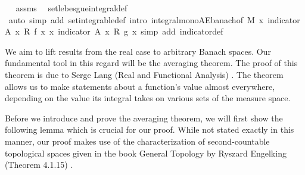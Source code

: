 \begin{isabellebody}
\isadelimproof
\ %
\endisadelimproof
%
\isatagproof
{}\isamarkupfalse%
\ assms\ \isamarkupfalse%
\ set{\isacharunderscore}{\kern0pt}lebesgue{\isacharunderscore}{\kern0pt}integral{\isacharunderscore}{\kern0pt}def\ \isamarkupfalse%
\ {\isacharparenleft}{\kern0pt}auto\ simp\ add{\isacharcolon}{\kern0pt}\ set{\isacharunderscore}{\kern0pt}integrable{\isacharunderscore}{\kern0pt}def\ intro{\isacharbang}{\kern0pt}{\isacharcolon}{\kern0pt}\ integral{\isacharunderscore}{\kern0pt}mono{\isacharunderscore}{\kern0pt}AE{\isacharunderscore}{\kern0pt}banach{\isacharbrackleft}{\kern0pt}of\ M\ {\isachardoublequoteopen}{\isasymlambda}x{\isachardot}{\kern0pt}\ indicator\ A\ x\ {\isacharasterisk}{\kern0pt}\isactrlsub R\ f\ x{\isachardoublequoteclose}\ {\isachardoublequoteopen}{\isasymlambda}x{\isachardot}{\kern0pt}\ indicator\ A\ x\ {\isacharasterisk}{\kern0pt}\isactrlsub R\ g\ x{\isachardoublequoteclose}{\isacharbrackright}{\kern0pt}{\isacharcomma}{\kern0pt}\ simp\ add{\isacharcolon}{\kern0pt}\ indicator{\isacharunderscore}{\kern0pt}def{\isacharparenright}{\kern0pt}%
\endisatagproof
{\isafoldproof}%
%
\isadelimproof
%
\endisadelimproof
%
\isadelimdocument
%
\endisadelimdocument
%
\isatagdocument
%
\isamarkuptrue%
%
\endisatagdocument
{\isafolddocument}%
%
\isadelimdocument
%
\endisadelimdocument
%
\begin{isamarkuptext}%
We aim to lift results from the real case to arbitrary Banach spaces. 
      Our fundamental tool in this regard will be the averaging theorem. The proof of this theorem is due to Serge Lang (Real and Functional Analysis) . 
      The theorem allows us to make statements about a function’s value almost everywhere, depending on the value its integral takes on various sets of the measure space.%
\end{isamarkuptext}\isamarkuptrue%
%
\begin{isamarkuptext}%
Before we introduce and prove the averaging theorem, we will first show the following lemma which is crucial for our proof. 
      While not stated exactly in this manner, our proof makes use of the characterization of second-countable topological spaces given in the book General Topology by Ryszard Engelking (Theorem 4.1.15) .%

\end{isamarkuptext}
\end{isabellebody}
